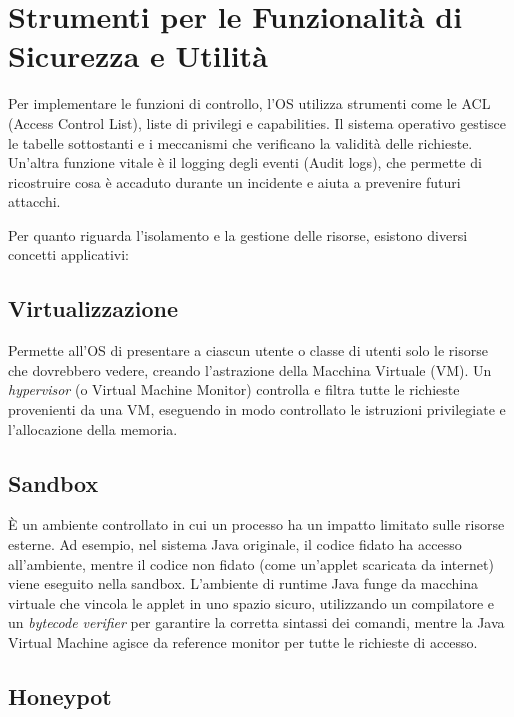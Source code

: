 \documentclass{article}
\begin{document}
\vspace{0.8cm}

\section*{Strumenti per le Funzionalità di Sicurezza e Utilità}

Per implementare le funzioni di controllo, l'OS utilizza strumenti come le ACL (Access Control List), liste di privilegi e capabilities. Il sistema operativo gestisce le tabelle sottostanti e i meccanismi che verificano la validità delle richieste. Un'altra funzione vitale è il logging degli eventi (Audit logs), che permette di ricostruire cosa è accaduto durante un incidente e aiuta a prevenire futuri attacchi.

Per quanto riguarda l'isolamento e la gestione delle risorse, esistono diversi concetti applicativi:

\subsection*{Virtualizzazione}

Permette all'OS di presentare a ciascun utente o classe di utenti solo le risorse che dovrebbero vedere, creando l'astrazione della Macchina Virtuale (VM). Un \textit{hypervisor} (o Virtual Machine Monitor) controlla e filtra tutte le richieste provenienti da una VM, eseguendo in modo controllato le istruzioni privilegiate e l'allocazione della memoria.

\subsection*{Sandbox}

È un ambiente controllato in cui un processo ha un impatto limitato sulle risorse esterne. Ad esempio, nel sistema Java originale, il codice fidato ha accesso all'ambiente, mentre il codice non fidato (come un'applet scaricata da internet) viene eseguito nella sandbox. L'ambiente di runtime Java funge da macchina virtuale che vincola le applet in uno spazio sicuro, utilizzando un compilatore e un \textit{bytecode verifier} per garantire la corretta sintassi dei comandi, mentre la Java Virtual Machine agisce da reference monitor per tutte le richieste di accesso.

\subsection*{Honeypot}
\end{document}
